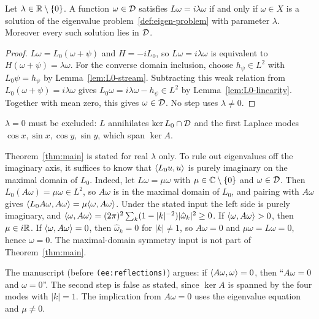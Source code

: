 \begin{lemma}
\label{lem:reduction}
\leanok
Let $\lambda\in\mathbb{R}\setminus\{0\}$. A function $\omega\in\mathcal{D}$ satisfies
$L\omega=i\lambda\omega$ if and only if $\omega\in X$ is a solution of the
eigenvalue problem~\ref{def:eigen-problem} with parameter $\lambda$. Moreover
every such solution lies in $\mathcal{D}$.
\end{lemma}

\begin{proof}
\leanok
$L\omega=L_0(\omega+\psi)$ and $H=-iL_0$, so $L\omega=i\lambda\omega$ is
equivalent to $H(\omega+\psi)=\lambda\omega$. For the converse domain
inclusion, choose $h_\psi\in L^2$ with $L_0\psi=h_\psi$ by
Lemma~\ref{lem:L0-stream}. Subtracting this weak relation from
$L_0(\omega+\psi)=i\lambda\omega$ gives
$L_0\omega=i\lambda\omega-h_\psi\in L^2$ by
Lemma~\ref{lem:L0-linearity}. Together with mean zero, this gives
$\omega\in\mathcal{D}$. No step uses $\lambda\ne0$.
\end{proof}

\begin{remark}
$\lambda=0$ must be excluded: $L$ annihilates $\ker L_0\cap\mathcal{D}$ and the first
Laplace modes $\cos x,\sin x,\cos y,\sin y$, which span $\ker A$.
\end{remark}

\begin{remark}
Theorem~\ref{thm:main} is stated for real $\lambda$ only. To rule out
eigenvalues off the imaginary axis, it suffices to know that
$\langle L_0u,u\rangle$ is purely imaginary on the maximal domain of $L_0$.
Indeed, let $L\omega=\mu\omega$ with
$\mu\in\mathbb{C}\setminus\{0\}$ and $\omega\in\mathcal{D}$. Then $L_0(A\omega)=\mu\omega\in L^2$, so
$A\omega$ is in the maximal domain of $L_0$, and pairing with $A\omega$ gives
$\langle L_0A\omega,A\omega\rangle=\mu\langle \omega,A\omega\rangle$. Under the stated input the
left side is purely imaginary, and
$\langle \omega,A\omega\rangle=(2\pi)^2\sum_k(1-|k|^{-2})|\hat\omega_k|^2\ge0$.
If $\langle \omega,A\omega\rangle>0$, then $\mu\in i\mathbb{R}$. If $\langle \omega,A\omega\rangle=0$, then
$\hat\omega_k=0$ for $|k|\ne1$, so $A\omega=0$ and $\mu\omega=L\omega=0$, hence
$\omega=0$. The maximal-domain symmetry input is not part of
Theorem~\ref{thm:main}.
\end{remark}

\begin{remark}
The manuscript (before \texttt{(ee:reflections)}) argues: if
$\langle A\omega,\omega\rangle=0$, then ``$A\omega=0$ and $\omega=0$''. The second step
is false as stated, since $\ker A$ is spanned by the four modes with $|k|=1$.
The implication from $A\omega=0$ uses the eigenvalue equation and $\mu\ne0$.
\end{remark}

